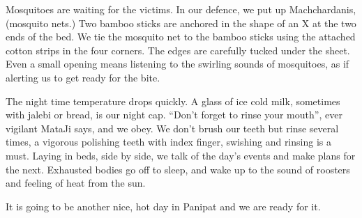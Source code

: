 Mosquitoes are waiting for the victims. In our defence, we put up
Machchardanis, (mosquito nets.) Two bamboo sticks are anchored in the
shape of an X at the two ends of the bed. We tie the mosquito net to the
bamboo sticks using the attached cotton strips in the four corners. The
edges are carefully tucked under the sheet. Even a small opening means
listening to the swirling sounds of mosquitoes, as if alerting us to get
ready for the bite. 
 
The night time temperature drops quickly. A glass of ice cold milk,
sometimes with jalebi or bread, is our night cap. “Don't forget to rinse
your mouth”, ever vigilant MataJi says, and we obey. We don’t brush our
teeth but rinse several times, a vigorous polishing teeth with index
finger, swishing and rinsing is a must. Laying in beds, side by side, we
talk of the day's events and make plans for the next. Exhausted bodies go
off to sleep, and wake up to the sound of roosters and feeling of heat
from the sun. 
 
It is going to be another nice, hot day in Panipat and we are ready for
it.  
